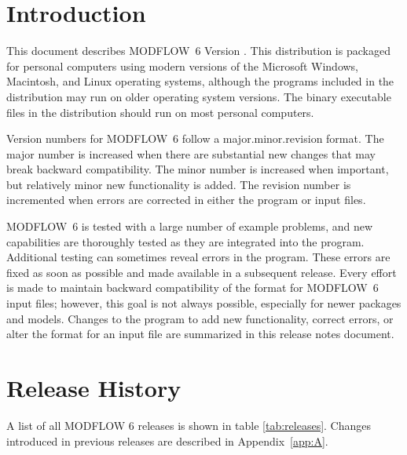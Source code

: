 \documentclass[11pt,twoside,twocolumn]{usgsreport}
\begin{document}
\ifdef{\makefrontcoveralt}{\makefrontcoveralt}{\makefrontcover}

\ifdef{\makefrontmatterabv}{\makefrontmatterabv}{\makefrontmatter}

\onecolumn
\pagestyle{body}
\RaggedRight
{}
\pagestyle{body}
\setlength{\parindent}{1.5pc}

\section{Introduction}
This document describes MODFLOW~6 Version \modflowversion.  This distribution is packaged for personal computers using modern versions of the Microsoft Windows, Macintosh, and Linux operating systems, although the programs included in the distribution may run on older operating system versions.  The binary executable files in the distribution should run on most personal computers.

Version numbers for MODFLOW~6 follow a major.minor.revision format.  The major number is increased when there are substantial new changes that may break backward compatibility.  The minor number is increased when important, but relatively minor new functionality is added.  The revision number is incremented when errors are corrected in either the program or input files.

MODFLOW~6 is tested with a large number of example problems, and new capabilities are thoroughly tested as they are integrated into the program.  Additional testing can sometimes reveal errors in the program.  These errors are fixed as soon as possible and made available in a subsequent release.  Every effort is made to maintain backward compatibility of the format for MODFLOW~6 input files; however, this goal is not always possible, especially for newer packages and models.  Changes to the program to add new functionality, correct errors, or alter the format for an input file are summarized in this release notes document.


\section{Release History}
A list of all MODFLOW 6 releases is shown in table \ref{tab:releases}.  Changes introduced in previous releases are described in Appendix~\ref{app:A}.
\end{document}
